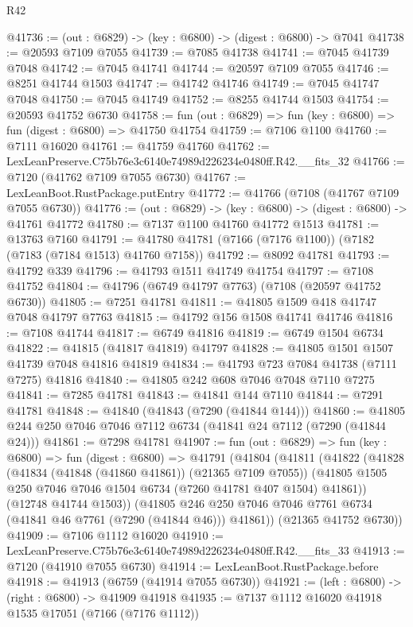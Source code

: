 \begin{lexlean}{R42}
\begin{coremodule}
{@41736 := (out : @6829) -> (key : @6800) -> (digest : @6800) -> @7041
@41738 := @20593 @7109 @7055
@41739 := @7085 @41738
@41741 := @7045 @41739 @7048
@41742 := @7045 @41741
@41744 := @20597 @7109 @7055
@41746 := @8251 @41744 @1503
@41747 := @41742 @41746
@41749 := @7045 @41747 @7048
@41750 := @7045 @41749
@41752 := @8255 @41744 @1503
@41754 := @20593 @41752 @6730
@41758 := fun (out : @6829) => fun (key : @6800) => fun (digest : @6800) => @41750 @41754
@41759 := @7106 @1100
@41760 := @7111 @16020
@41761 := @41759 @41760
@41762 := LexLeanPreserve.C75b76e3c6140e74989d226234e0480ff.R42.__fits_32
@41766 := @7120 (@41762 @7109 @7055 @6730)
@41767 := LexLeanBoot.RustPackage.putEntry
@41772 := @41766 (@7108 (@41767 @7109 @7055 @6730))
@41776 := (out : @6829) -> (key : @6800) -> (digest : @6800) -> @41761 @41772
@41780 := @7137 @1100 @41760 @41772 @1513
@41781 := @13763 @7160
@41791 := @41780 @41781 (@7166 (@7176 @1100)) (@7182 (@7183 (@7184 @1513) @41760 @7158))
@41792 := @8092 @41781
@41793 := @41792 @339
@41796 := @41793 @1511 @41749 @41754
@41797 := @7108 @41752
@41804 := @41796 (@6749 @41797 @7763) (@7108 (@20597 @41752 @6730))
@41805 := @7251 @41781
@41811 := @41805 @1509 @418 @41747 @7048 @41797 @7763
@41815 := @41792 @156 @1508 @41741 @41746
@41816 := @7108 @41744
@41817 := @6749 @41816
@41819 := @6749 @1504 @6734
@41822 := @41815 (@41817 @41819) @41797
@41828 := @41805 @1501 @1507 @41739 @7048 @41816 @41819
@41834 := @41793 @723 @7084 @41738 (@7111 @7275) @41816
@41840 := @41805 @242 @608 @7046 @7048 @7110 @7275
@41841 := @7285 @41781
@41843 := @41841 @144 @7110
@41844 := @7291 @41781
@41848 := @41840 (@41843 (@7290 (@41844 @144)))
@41860 := @41805 @244 @250 @7046 @7046 @7112 @6734 (@41841 @24 @7112 (@7290 (@41844 @24)))
@41861 := @7298 @41781
@41907 := fun (out : @6829) =>
  fun (key : @6800) =>
  fun (digest : @6800) =>
  @41791
    (@41804
      (@41811
        (@41822
          (@41828
            (@41834 (@41848 (@41860 @41861)) (@21365 @7109 @7055))
            (@41805 @1505 @250 @7046 @7046 @1504 @6734 (@7260 @41781 @407 @1504) @41861))
          (@12748 @41744 @1503))
        (@41805 @246 @250 @7046 @7046 @7761 @6734 (@41841 @46 @7761 (@7290 (@41844 @46))) @41861))
      (@21365 @41752 @6730))
@41909 := @7106 @1112 @16020
@41910 := LexLeanPreserve.C75b76e3c6140e74989d226234e0480ff.R42.__fits_33
@41913 := @7120 (@41910 @7055 @6730)
@41914 := LexLeanBoot.RustPackage.before
@41918 := @41913 (@6759 (@41914 @7055 @6730))
@41921 := (left : @6800) -> (right : @6800) -> @41909 @41918
@41935 := @7137
    @1112
    @16020
    @41918
    @1535
    @17051
    (@7166 (@7176 @1112))
}
\end{coremodule}
\end{lexlean}
